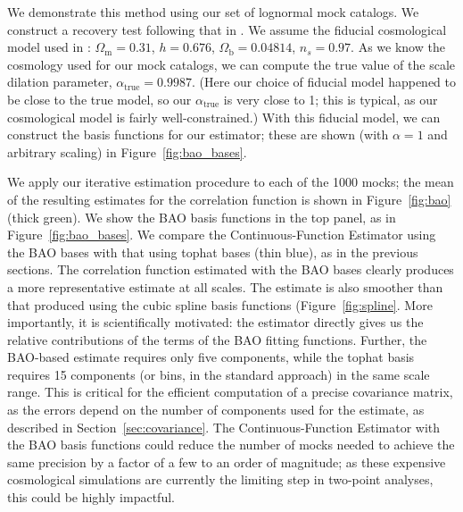 \documentclass[modern]{aastex62}
\newcommand{\Est}{The Continuous-Function Estimator\xspace}
\newcommand{\est}{the Continuous-Function Estimator\xspace}
\begin{document}
We demonstrate this method using our set of lognormal mock catalogs.
We construct a recovery test following that in \cite{Hinton2019}.
We assume the fiducial cosmological model used in \cite{Beutler2017}: $\Omega_{\text{m}} = 0.31$, $h = 0.676$, $\Omega_{\text{b}} = 0.04814$, $n_s = 0.97$. 
As we know the cosmology used for our mock catalogs, we can compute the true value of the scale dilation parameter, $\alpha_{\text{true}}=0.9987$.
(Here our choice of fiducial model happened to be close to the true model, so our $\alpha_{\text{true}}$ is very close to 1; this is typical, as our cosmological model is fairly well-constrained.)
With this fiducial model, we can construct the basis functions for our estimator; these are shown (with $\alpha=1$ and arbitrary scaling) in Figure~\ref{fig:bao_bases}.

We apply our iterative estimation procedure to each of the 1000 mocks; the mean of the resulting estimates for the correlation function is shown in Figure~\ref{fig:bao} (thick green).
We show the BAO basis functions in the top panel, as in Figure~\ref{fig:bao_bases}.
We compare \est using the BAO bases with that using tophat bases (thin blue), as in the previous sections.
The correlation function estimated with the BAO bases clearly produces a more representative estimate at all scales.
The estimate is also smoother than that produced using the cubic spline basis functions (Figure~\ref{fig:spline}.
More importantly, it is scientifically motivated: the estimator directly gives us the relative contributions of the terms of the BAO fitting functions.
Further, the BAO-based estimate requires only five components, while the tophat basis requires 15 components (or bins, in the standard approach) in the same scale range.
This is critical for the efficient computation of a precise covariance matrix, as the errors depend on the number of components used for the estimate, as described in Section~\ref{sec:covariance}.
\Est with the BAO basis functions could reduce the number of mocks needed to achieve the same precision by a factor of a few to an order of magnitude; as these expensive cosmological simulations are currently the limiting step in two-point analyses, this could be highly impactful.
\end{document}
